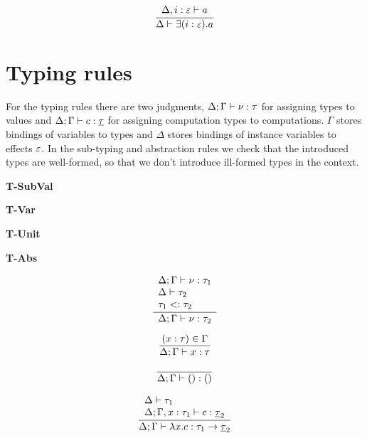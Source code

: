 \[\frac{
	\begin{array}{l}
	\Delta , i : \varepsilon \vdash a  \\
	\end{array}
}{
	\Delta \vdash \exists(i:\varepsilon) . a
}\]

\section{Typing rules}
For the typing rules there are two judgments,
$\Delta;\Gamma \vdash \nu : \tau$ for assigning types to values and $\Delta;\Gamma \vdash c : \underline{\tau}$ for assigning computation types to computations. $\Gamma$ stores bindings of variables to types and $\Delta$ stores bindings of instance variables to effects $\varepsilon$.
In the sub-typing and abstraction rules we check that the introduced types are well-formed, so that we don't introduce ill-formed types in the context.

\begin{minipage}{0.25\textwidth}
\textbf{T-SubVal}
\end{minipage}
\begin{minipage}{0.25\textwidth}
\textbf{T-Var}
\end{minipage}
\begin{minipage}{0.25\textwidth}
\textbf{T-Unit}
\end{minipage}
\begin{minipage}{0.25\textwidth}
\textbf{T-Abs}
\end{minipage}

\begin{minipage}{0.25\textwidth}
\[\frac{
	\begin{array}{l}
	\Delta;\Gamma \vdash \nu : \tau_1 \\
	\Delta \vdash \tau_2 \\
	\tau_1 <: \tau_2
	\end{array}
}{
	\Delta;\Gamma \vdash \nu : \tau_2
}\]
\end{minipage}
\begin{minipage}{0.25\textwidth}
\[\frac{
	(x:\tau) \in \Gamma
}{
	\Delta;\Gamma \vdash x : \tau
}\]
\end{minipage}
\begin{minipage}{0.25\textwidth}
\[\frac{
}{
	\Delta;\Gamma \vdash () : ()
}\]
\end{minipage}
\begin{minipage}{0.25\textwidth}
\[\frac{
	\begin{array}{l}
	\Delta \vdash \tau_1 \\
	\Delta;\Gamma, x : \tau_1 \vdash c : \underline{\tau}_2
	\end{array}
}{
	\Delta;\Gamma \vdash \lambda x . c : \tau_1 \rightarrow \underline{\tau}_2
}\]
\end{minipage}

